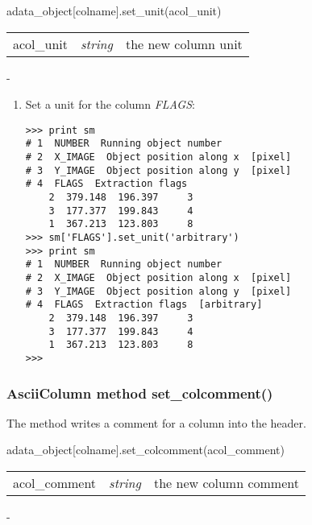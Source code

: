 adata\_object[colname].set\_unit(acol\_unit)

\begin{tabular}{lcl}
acol\_unit &{\it string}& the new column unit\\
\end{tabular}

-

\begin{enumerate}
\item Set a unit for the column {\sl FLAGS}:
\begin{small}
\begin{verbatim}
>>> print sm
# 1  NUMBER  Running object number
# 2  X_IMAGE  Object position along x  [pixel]
# 3  Y_IMAGE  Object position along y  [pixel]
# 4  FLAGS  Extraction flags
    2  379.148  196.397     3
    3  177.377  199.843     4
    1  367.213  123.803     8
>>> sm['FLAGS'].set_unit('arbitrary')
>>> print sm
# 1  NUMBER  Running object number
# 2  X_IMAGE  Object position along x  [pixel]
# 3  Y_IMAGE  Object position along y  [pixel]
# 4  FLAGS  Extraction flags  [arbitrary]
    2  379.148  196.397     3
    3  177.377  199.843     4
    1  367.213  123.803     8
>>>
\end{verbatim}
\end{small}
\end{enumerate}

\subsubsection{AsciiColumn method set\_colcomment()}
\label{acm_set_colcomment}
The method writes a comment for a column into the \ad header.

adata\_object[colname].set\_colcomment(acol\_comment)

\begin{tabular}{lcl}
acol\_comment &{\it string}& the new column comment\\
\end{tabular}

-

